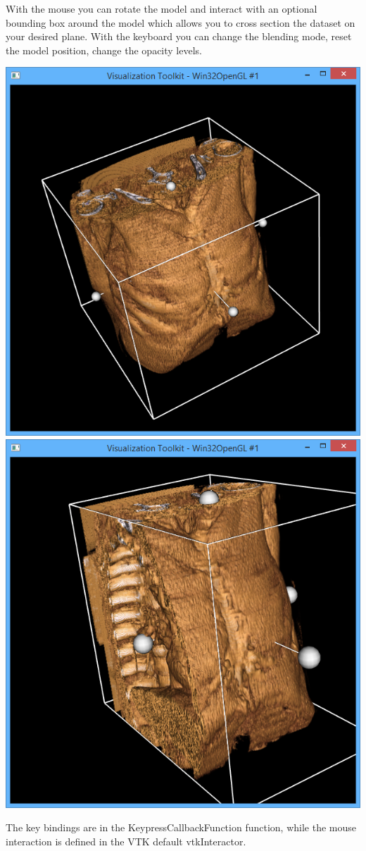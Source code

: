 \documentclass[11pt]{article} %
\begin{document}
\begin{description}
With the mouse you can rotate the model and interact with an optional bounding box around the model which allows you to cross section the dataset on your desired plane.
With the keyboard you can change the blending mode, reset the model position, change the opacity levels.

\includegraphics[width=0.5\linewidth]{img/smartvolumetricdemo_blending.PNG}
\includegraphics[width=0.5\linewidth]{img/smartvolumetricdemo_crosssection.PNG}

The key bindings are in the KeypressCallbackFunction function, while the mouse interaction is defined in the VTK default  vtkInteractor.


\end{description}
\end{document}
